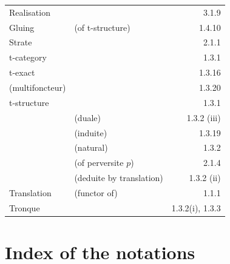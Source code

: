 \documentclass[12pt,a4paper]{article}
\theoremstyle{plain}
\theoremstyle{definition}
\theoremstyle{remark}
\begin{document}
\begin{tabular}{lp{8cm}r}
Realisation & & 3.1.9 \\
Gluing & (of t-structure) & 1.4.10 \\[4pt]
Strate & & 2.1.1 \\[4pt]
t-category & & 1.3.1 \\[4pt]
t-exact & & 1.3.16 \\
\quad (multifoncteur) & & 1.3.20 \\[4pt]
t-structure & & 1.3.1 \\
& (duale) & 1.3.2 (iii) \\
& (induite) & 1.3.19 \\
& (natural) & 1.3.2 \\
& (of perversite $p$) & 2.1.4 \\
& (deduite by translation) & 1.3.2 (ii) \\[4pt]
Translation & (functor of) & 1.1.1 \\[4pt]
Tronque & & 1.3.2(i), 1.3.3
\end{tabular}

\newpage
\section*{Index of the notations}
\end{document}
